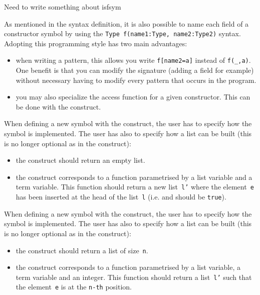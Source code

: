\label{isfsym} Need to write something about isfsym

\noindent
As mentioned in the syntax definition, it is also possible to name
each field of a constructor symbol by using the
\texttt{Type f(name1:Type, name2:Type2)} syntax.  
Adopting this programming style has two main advantages:
\begin{itemize}
\item when writing a pattern, this allows you write \texttt{f[name2=a]}
  instead of \texttt{f(\_,a)}. One benefit is that you can modify the
  signature (adding a field for example) without necessary having to
  modify every pattern that occurs in the program.

\item\label{getslot} you may also specialize the  access
function for a given constructor. This can be done with the
 construct.
\end{itemize}

\smallskip\noindent
When defining a new symbol with the  construct,
the user has to specify how the symbol is implemented. 
The user has also to specify how a list can be built (this is no
longer optional as in the  construct):
\begin{itemize}
\item the  construct should return an empty
  list.

\item the  construct corresponds to a function
  parametrised by a list variable and a term variable. This function
  should return a new list~\texttt{l'} where the element~\texttt{e}
  has been inserted at the head of the list~\texttt{l}
  (i.e.  and
   should be \texttt{true}).
\end{itemize}

\noindent
When defining a new symbol with the  construct,
the user has to specify how the symbol is implemented. 
The user has also to specify how a list can be built (this is no 
longer optional as in the  construct):
\begin{itemize}
\item the  construct should return a list of
  size~\texttt{n}.  

\item the  construct corresponds to a
  function parametrised by a list variable, a term variable and an
  integer. This function should return a list~\texttt{l'} such that
  the element~\texttt{e} is at the \texttt{n-th} position.
\end{itemize}

